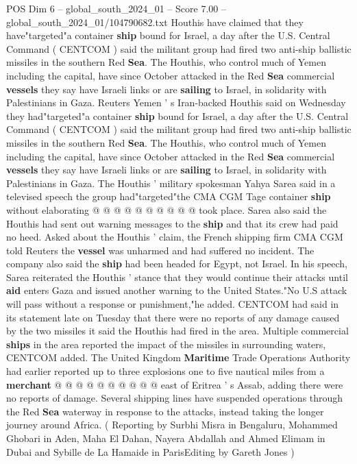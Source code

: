 \begin{textsample}{POS Dim 6 – global\_south\_2024\_01 – Score 7.00 – global\_south\_2024\_01/104790682.txt}  \label{ex:f6_pos_096}
Houthis have claimed that they have"targeted"a container \textbf{ship} bound for Israel, a day after the U.S.
Central Command ( CENTCOM ) said the militant group had fired two anti-ship ballistic missiles in the southern Red \textbf{Sea}.
The Houthis, who control much of Yemen including the capital, have since October attacked in the Red \textbf{Sea} commercial \textbf{vessels} they say have Israeli links or are \textbf{sailing} to Israel, in solidarity with Palestinians in Gaza.
Reuters Yemen ' s Iran-backed Houthis said on Wednesday they had"targeted"a container \textbf{ship} bound for Israel, a day after the U.S.
Central Command ( CENTCOM ) said the militant group had fired two anti-ship ballistic missiles in the southern Red \textbf{Sea}.
The Houthis, who control much of Yemen including the capital, have since October attacked in the Red \textbf{Sea} commercial \textbf{vessels} they say have Israeli links or are \textbf{sailing} to Israel, in solidarity with Palestinians in Gaza.
The Houthis ' military spokesman Yahya Sarea said in a televised speech the group had"targeted"the CMA CGM Tage container \textbf{ship} without elaborating @ @ @ @ @ @ @ @ @ @ took place.
Sarea also said the Houthis had sent out warning messages to the \textbf{ship} and that its crew had paid no heed.
Asked about the Houthis ' claim, the French shipping firm CMA CGM told Reuters the \textbf{vessel} was unharmed and had suffered no incident.
The company also said the \textbf{ship} had been headed for Egypt, not Israel.
In his speech, Sarea reiterated the Houthis ' stance that they would continue their attacks until \textbf{aid} enters Gaza and issued another warning to the United States."No U.S attack will pass without a response or punishment,"he added.
CENTCOM had said in its statement late on Tuesday that there were no reports of any damage caused by the two missiles it said the Houthis had fired in the area.
Multiple commercial \textbf{ships} in the area reported the impact of the missiles in surrounding waters, CENTCOM added.
The United Kingdom \textbf{Maritime} Trade Operations Authority had earlier reported up to three explosions one to five nautical miles from a \textbf{merchant} @ @ @ @ @ @ @ @ @ @ east of Eritrea ' s Assab, adding there were no reports of damage.
Several shipping lines have suspended operations through the Red \textbf{Sea} waterway in response to the attacks, instead taking the longer journey around Africa. ( Reporting by Surbhi Misra in Bengaluru, Mohammed Ghobari in Aden, Maha El Dahan, Nayera Abdallah and Ahmed Elimam in Dubai and Sybille de La Hamaide in ParisEditing by Gareth Jones )

\end{textsample}
